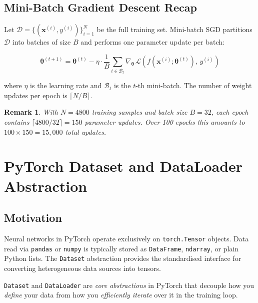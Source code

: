 \documentclass[12pt,a4paper]{article}
\newtheorem{remark}{Remark}[section]
\begin{document}
\subsection{Mini-Batch Gradient Descent Recap}

Let $\mathcal{D} = \{(\mathbf{x}^{(i)}, y^{(i)})\}_{i=1}^{N}$ be the full
training set.  Mini-batch SGD partitions $\mathcal{D}$ into batches of size
$B$ and performs one parameter update per batch:

\begin{equation}
  \boldsymbol{\theta}^{(t+1)} = \boldsymbol{\theta}^{(t)}
    - \eta \cdot \frac{1}{B}
      \sum_{i \in \mathcal{B}_t} \nabla_{\boldsymbol{\theta}}\,
      \mathcal{L}\!\left(f(\mathbf{x}^{(i)};\boldsymbol{\theta}^{(t)}),\, y^{(i)}\right)
  \label{eq:sgd}
\end{equation}

where $\eta$ is the learning rate and $\mathcal{B}_t$ is the $t$-th mini-batch.
The number of weight updates per epoch is $\lceil N/B \rceil$.

\begin{remark}
\label{rem:batches}
With $N = 4800$ training samples and batch size $B = 32$, each epoch contains
$\lceil 4800 / 32 \rceil = 150$ parameter updates.  Over 100 epochs this
amounts to $100 \times 150 = 15{,}000$ total updates.
\end{remark}

\section{PyTorch Dataset and DataLoader Abstraction}
\label{sec:dataset}

\subsection{Motivation}
\label{subsec:motivation}

Neural networks in PyTorch operate exclusively on \texttt{torch.Tensor}
objects.  Data read via \texttt{pandas} or \texttt{numpy} is typically stored
as \texttt{DataFrame}, \texttt{ndarray}, or plain Python lists.  The
\texttt{Dataset} abstraction provides the standardised interface for
converting heterogeneous data sources into tensors.

\begin{keyinsight}[title=Dataset--DataLoader Decoupling]
\texttt{Dataset} and \texttt{DataLoader} are \emph{core abstractions} in
PyTorch that decouple how you \emph{define} your data from how you
\emph{efficiently iterate} over it in the training loop.
\end{keyinsight}
\end{document}
